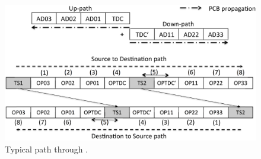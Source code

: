 \begin{figure}[h]
\centering
\includegraphics[width=.9\columnwidth]{./fig/nex_fwd1.eps}
\caption{Typical path through \TDC.}\label{fig:ex-fwd-typical}
\end{figure}

